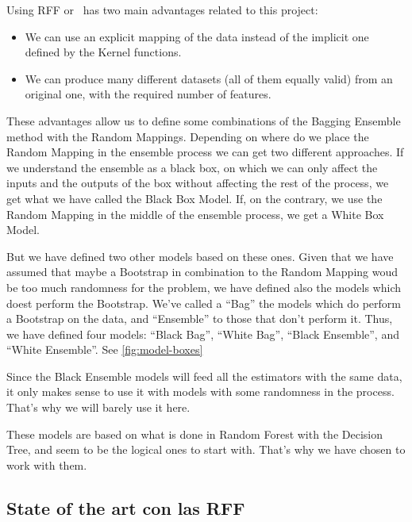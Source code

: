\begin{pre-delivery}
  Using RFF or \Nys\ has two main advantages related to this project:
  \begin{itemize}
    \item We can use an explicit mapping of the data instead of the implicit
    one defined by the Kernel functions.
    \item We can produce many different datasets (all of them equally valid)
    from an original one, with the required number of features.
  \end{itemize}
  These advantages allow us to define some combinations of the Bagging
  Ensemble method with the Random Mappings. Depending on where do we place
  the Random Mapping in the ensemble process we can get two different approaches.
  If we understand the ensemble as a black box, on which we can only affect the
  inputs and the outputs of the box without affecting the rest of the process,
  we get what we have called the Black Box Model. If, on the contrary, we use
  the Random Mapping in the middle of the ensemble process, we get a White Box
  Model.

  But we have defined two other models based on these ones. Given that we have
  assumed that maybe a Bootstrap in combination to the Random Mapping woud be
  too much randomness for the problem, we have defined also the models which
  doest perform the Bootstrap. We've called a ``Bag'' the models which do
  perform a Bootstrap on the data, and ``Ensemble'' to those that don't
  perform it. Thus, we have defined four models: ``Black Bag'', ``White Bag'',
  ``Black Ensemble'', and ``White Ensemble''. See \ref{fig:model-boxes}


  Since the Black Ensemble models will feed all the estimators with the same
  data, it only makes sense to use it with models with some randomness in the
  process. That's why we will barely use it here.

  These models are based on what is done in Random Forest with the Decision
  Tree, and seem to be the logical ones to start with. That's why we have chosen
  to work with them.
\end{pre-delivery}
\BlackBoxes
\begin{note}
  \subsection{State of the art con las RFF}
\end{note}
